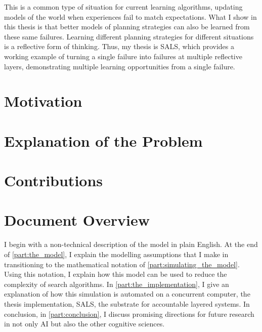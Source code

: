 This is a common type of situation for current learning algorithms,
updating models of the world when experiences fail to match
expectations.  What I show in this thesis is that better models of
planning strategies can also be learned from these same failures.
Learning different planning strategies for different situations is a
reflective form of thinking.  Thus, my thesis is SALS, which provides
a working example of turning a single failure into failures at
multiple reflective layers, demonstrating multiple learning
opportunities from a single failure.

\section{Motivation}

\section{Explanation of the Problem}

\section{Contributions}

\section{Document Overview}

I begin with a non-technical description of the model in plain
English.  At the end of {\mbox{\autoref{part:the_model}}}, I explain
the modelling assumptions that I make in transitioning to the
mathematical notation of {\mbox{\autoref{part:simulating_the_model}}}.
Using this notation, I explain how this model can be used to reduce
the complexity of search algorithms.  In
{\mbox{\autoref{part:the_implementation}}}, I give an explanation of
how this simulation is automated on a concurrent computer, the thesis
implementation, SALS, the substrate for accountable layered systems.
In conclusion, in {\mbox{\autoref{part:conclusion}}}, I discuss
promising directions for future research in not only AI but also the
other cognitive sciences.






